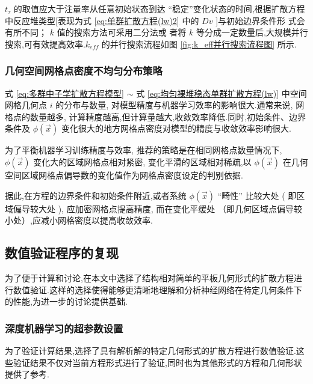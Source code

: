 \documentclass{Sichuan Normal University}
\begin{document}
$t_\tau$ 的取值应大于注量率从任意初始状态到达 “稳定”变化状态的时间,根据扩散方程中反应堆类型[表现为式 \eqref{eq:单群扩散方程(lw)2} 中的 $Dv$ ]与初始边界条件形 式会有所不同；
$k$ 值的搜索方法可采用二分法或 者将 $k$ 等分成一定数量后,大规模并行搜索,可有效提高效率.$k_{eff}$ 的并行搜索流程如图 \ref{fig:k_eff并行搜索流程图} 所示.

\subsubsection{几何空间网格点密度不均匀分布策略}\label{sec:几何空间网格点密度不均匀分布策略}
式 \eqref{eq:多群中子学扩散方程模型}  $\sim$ 式 \eqref{eq:均匀裸堆稳态单群扩散方程(lw)} 中空间网格几何点 $i$ 的分布与数量, 对模型精度与机器学习效率的影响很大.通常来说, 网格点的数量越多, 计算精度越高,但计算量越大,收敛效率降低.同时,初始条件、边界条件及 $\phi(\vec{x})$ 变化很大的地方网格点密度对模型的精度与收敛效率影响很大.

为了平衡机器学习训练精度与效率, 推荐的策略是在相同网格点数量情况下, $\phi(\vec{x})$ 变化大的区域网格点相对紧密, 变化平滑的区域相对稀疏,以 $\phi(\vec{x})$ 在几何空间区域网格点偏导数的变化值作为网格点密度设定的判别依据.

据此,在方程的边界条件和初始条件附近,或者系统 $\phi(\vec{x})$ “畸性” 比较大处 ( 即区域偏导较大处 ), 应加密网格点提高精度, 而在变化平缓处 （即几何区域点偏导较小处）,应减小网格密度以提高收敛效率.
\subsection{数值验证程序的复现}

为了便于计算和讨论,在本文中选择了结构相对简单的平板几何形式的扩散方程进行数值验证.这样的选择使得能够更清晰地理解和分析神经网络在特定几何条件下的性能,为进一步的讨论提供基础.

\subsubsection{深度机器学习的超参数设置}

为了验证计算结果,选择了具有解析解的特定几何形式的扩散方程进行数值验证.这些验证结果不仅对当前方程形式进行了验证,同时也为其他形式的方程和几何形状提供了参考.
\end{document}
